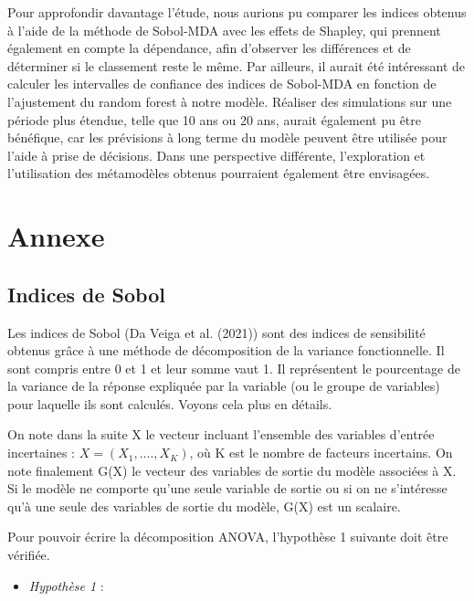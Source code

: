 \documentclass[
]{article}
\providecommand{\tightlist}{%
  \setlength{\itemsep}{0pt}\setlength{\parskip}{0pt}}
\begin{document}
Pour approfondir davantage l'étude, nous aurions pu comparer les indices
obtenus à l'aide de la méthode de Sobol-MDA avec les effets de Shapley,
qui prennent également en compte la dépendance, afin d'observer les
différences et de déterminer si le classement reste le même. Par
ailleurs, il aurait été intéressant de calculer les intervalles de
confiance des indices de Sobol-MDA en fonction de l'ajustement du random
forest à notre modèle. Réaliser des simulations sur une période plus
étendue, telle que 10 ans ou 20 ans, aurait également pu être bénéfique,
car les prévisions à long terme du modèle peuvent être utilisée pour
l'aide à prise de décisions. Dans une perspective différente,
l'exploration et l'utilisation des métamodèles obtenus pourraient
également être envisagées.

\hypertarget{annexe}{%
\section{Annexe}\label{annexe}}

\hypertarget{indices-de-sobol}{%
\subsection{Indices de Sobol}\label{indices-de-sobol}}

Les indices de Sobol (Da Veiga et al. (2021)) sont des indices de
sensibilité obtenus grâce à une méthode de décomposition de la variance
fonctionnelle. Il sont compris entre 0 et 1 et leur somme vaut 1. Il
représentent le pourcentage de la variance de la réponse expliquée par
la variable (ou le groupe de variables) pour laquelle ils sont calculés.
Voyons cela plus en détails.

On note dans la suite X le vecteur incluant l'ensemble des variables
d'entrée incertaines : \(X = (X_1 ,...., X_K)\), où K est le nombre de
facteurs incertains. On note finalement G(X) le vecteur des variables de
sortie du modèle associées à X. Si le modèle ne comporte qu'une seule
variable de sortie ou si on ne s'intéresse qu'à une seule des variables
de sortie du modèle, G(X) est un scalaire.

Pour pouvoir écrire la décomposition ANOVA, l'hypothèse 1 suivante doit
être vérifiée.

\begin{itemize}
\tightlist
\item
  \textit{Hypothèse 1} :
\end{itemize}
\end{document}
